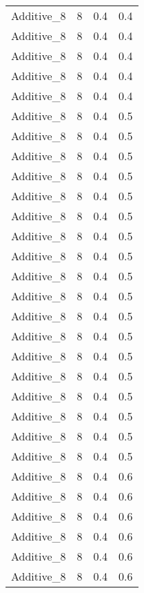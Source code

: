\documentclass{article}
\begin{document}
\begin{longtable}[H]{lrrr}
 Additive\_8 &       8 &   0.4 &            0.4 \\
 Additive\_8 &       8 &   0.4 &            0.4 \\
 Additive\_8 &       8 &   0.4 &            0.4 \\
 Additive\_8 &       8 &   0.4 &            0.4 \\
 Additive\_8 &       8 &   0.4 &            0.4 \\
 Additive\_8 &       8 &   0.4 &            0.5 \\
 Additive\_8 &       8 &   0.4 &            0.5 \\
 Additive\_8 &       8 &   0.4 &            0.5 \\
 Additive\_8 &       8 &   0.4 &            0.5 \\
 Additive\_8 &       8 &   0.4 &            0.5 \\
 Additive\_8 &       8 &   0.4 &            0.5 \\
 Additive\_8 &       8 &   0.4 &            0.5 \\
 Additive\_8 &       8 &   0.4 &            0.5 \\
 Additive\_8 &       8 &   0.4 &            0.5 \\
 Additive\_8 &       8 &   0.4 &            0.5 \\
 Additive\_8 &       8 &   0.4 &            0.5 \\
 Additive\_8 &       8 &   0.4 &            0.5 \\
 Additive\_8 &       8 &   0.4 &            0.5 \\
 Additive\_8 &       8 &   0.4 &            0.5 \\
 Additive\_8 &       8 &   0.4 &            0.5 \\
 Additive\_8 &       8 &   0.4 &            0.5 \\
 Additive\_8 &       8 &   0.4 &            0.5 \\
 Additive\_8 &       8 &   0.4 &            0.5 \\
 Additive\_8 &       8 &   0.4 &            0.6 \\
 Additive\_8 &       8 &   0.4 &            0.6 \\
 Additive\_8 &       8 &   0.4 &            0.6 \\
 Additive\_8 &       8 &   0.4 &            0.6 \\
 Additive\_8 &       8 &   0.4 &            0.6 \\
 Additive\_8 &       8 &   0.4 &            0.6 \\

\end{longtable}
\end{document}
